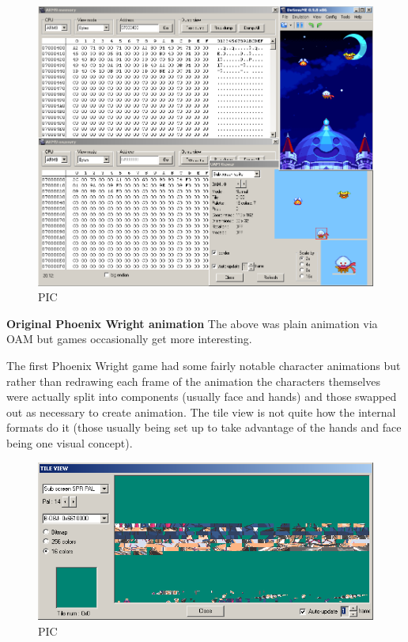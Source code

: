\documentclass[
]{book}
\begin{document}
\begin{figure}
\centering
\includegraphics{images/50_home_fast6191_romhackingguide_unrenamed_file___ginal_borders_romhackingguideOAManimation_3.png}
\caption{PIC}
\end{figure}

\textbf{Original Phoenix Wright animation} The above was plain animation via OAM but games occasionally get more interesting.

The first Phoenix Wright game had some fairly notable character animations but rather than redrawing each frame of the animation the characters themselves were actually split into components (usually face and hands) and those swapped out as necessary to create animation. The tile view is not quite how the internal formats do it (those usually being set up to take advantage of the hands and face being one visual concept).

\begin{figure}
\centering
\includegraphics{images/51_home_fast6191_romhackingguide_unrenamed_file___nal_borders_romhackingguideOAManimation_2_1.png}
\caption{PIC}
\end{figure}
\end{document}

